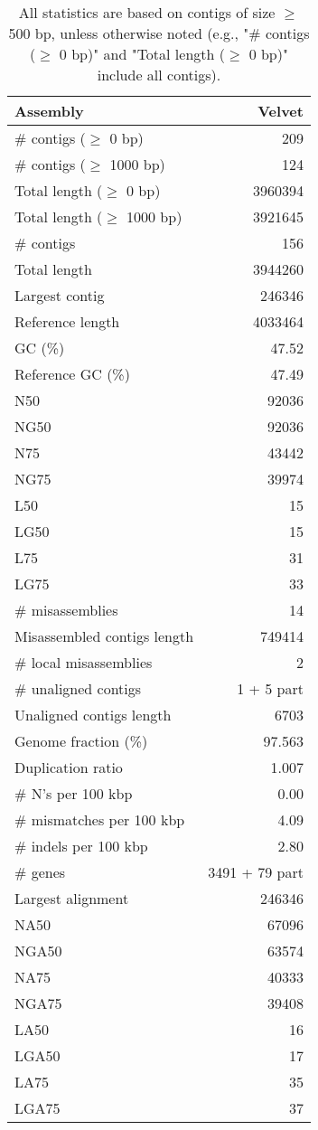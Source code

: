 \documentclass[12pt,a4paper]{article}
\begin{document}
\begin{table}[ht]
\begin{center}
\caption{All statistics are based on contigs of size $\geq$ 500 bp, unless otherwise noted (e.g., "\# contigs ($\geq$ 0 bp)" and "Total length ($\geq$ 0 bp)" include all contigs).}
\begin{tabular}{|l*{1}{|r}|}
\hline
Assembly & Velvet \\ \hline
\# contigs ($\geq$ 0 bp) & 209 \\ \hline
\# contigs ($\geq$ 1000 bp) & 124 \\ \hline
Total length ($\geq$ 0 bp) & 3960394 \\ \hline
Total length ($\geq$ 1000 bp) & 3921645 \\ \hline
\# contigs & 156 \\ \hline
Total length & 3944260 \\ \hline
Largest contig & 246346 \\ \hline
Reference length & 4033464 \\ \hline
GC (\%) & 47.52 \\ \hline
Reference GC (\%) & 47.49 \\ \hline
N50 & 92036 \\ \hline
NG50 & 92036 \\ \hline
N75 & 43442 \\ \hline
NG75 & 39974 \\ \hline
L50 & 15 \\ \hline
LG50 & 15 \\ \hline
L75 & 31 \\ \hline
LG75 & 33 \\ \hline
\# misassemblies & 14 \\ \hline
Misassembled contigs length & 749414 \\ \hline
\# local misassemblies & 2 \\ \hline
\# unaligned contigs & 1 + 5 part \\ \hline
Unaligned contigs length & 6703 \\ \hline
Genome fraction (\%) & 97.563 \\ \hline
Duplication ratio & 1.007 \\ \hline
\# N's per 100 kbp & 0.00 \\ \hline
\# mismatches per 100 kbp & 4.09 \\ \hline
\# indels per 100 kbp & 2.80 \\ \hline
\# genes & 3491 + 79 part \\ \hline
Largest alignment & 246346 \\ \hline
NA50 & 67096 \\ \hline
NGA50 & 63574 \\ \hline
NA75 & 40333 \\ \hline
NGA75 & 39408 \\ \hline
LA50 & 16 \\ \hline
LGA50 & 17 \\ \hline
LA75 & 35 \\ \hline
LGA75 & 37 \\ \hline
\end{tabular}
\end{center}
\end{table}
\end{document}
